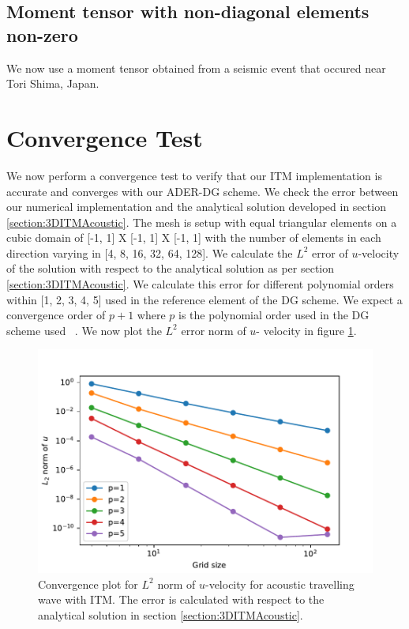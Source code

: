 \subsection{Moment tensor with non-diagonal elements non-zero}
We now use a moment tensor obtained from a seismic event that occured near Tori Shima, Japan. 
\section{Convergence Test}\label{sec:convergence}
We now perform a convergence test to verify that our \ac{ITM} implementation is accurate and converges with our \ac{ADER}-\ac{DG} scheme. 
We check the error between our numerical implementation and the analytical solution developed in section \ref{section:3DITMAcoustic}. 
The mesh is setup with equal triangular elements on a cubic domain of [-1, 1] X [-1, 1] X [-1, 1] with the number of elements in each direction varying in [4, 8, 16, 32, 64, 128].
We calculate the $L^2$ error of $u$-velocity of the solution with respect to the analytical solution as per section \ref{section:3DITMAcoustic}. We calculate this error for different polynomial
orders within [1, 2, 3, 4, 5] used in the reference element of the \ac{DG} scheme. We expect a convergence order of $p+1$ where $p$ is the polynomial order used in the
\ac{DG} scheme used ~\parencite{cockburn2011discontinuous}. We now plot the $L^2$ error norm of $u$- velocity in figure \ref{fig:convergence}.

\begin{figure}
    \centering
    \includegraphics[width=0.75\linewidth]{figures/error1.pdf}
    \caption{Convergence plot for $L^2$ norm of $u$-velocity for acoustic travelling wave with \ac{ITM}. The error is calculated with respect to the analytical solution
    in section \ref{section:3DITMAcoustic}.}
    \label{fig:convergence}
\end{figure}

